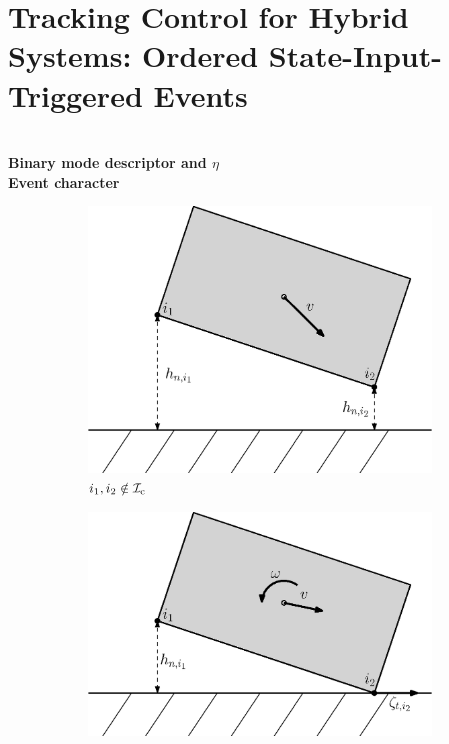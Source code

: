 \documentclass[../DC2017114Bouma.tex]{subfiles}
\begin{document}
\graphicspath{{03_Contribution/img/}}
\renewcommand{\chaptermark}[1]{\markboth{\thechapter.\ #1}{}}
\renewcommand{\sectionmark}[1]{\markright{#1}{}}

\pagestyle{fancyreport}
\cleartooddpage
\pagestyle{fancyreport}
\chapter{Tracking Control for Hybrid Systems: Ordered State-Input-Triggered Events}\label{ch:order}
\cite{Rijnen2017}\\
\textbf{Binary mode descriptor and $\eta$}\\
\textbf{Event character}\\

\begin{figure}[h]
\centering
\begin{subfigure}[b]{0.475\textwidth}
\centering
\includegraphics[width=\textwidth]{example1.eps}
\caption{$i_1,i_2\notin\mathcal{I}_{\text{c}}$}
\label{fig:example1}
\end{subfigure}
\hfill
\begin{subfigure}[b]{0.475\textwidth}  
\centering 
\includegraphics[width=\textwidth]{example2.eps}

\end{subfigure}
\end{figure}
\end{document}
